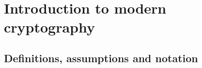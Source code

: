 \documentclass[a4paper, 12pt]{report}
\institute{\curlyquotes{\hspace{0.25mm}Sapienza} Università di Roma}
\subtitle{Appunti integrati con il libro \book}
\author{\textit{Autore}\\\authorName}
\institute{\curlyquotes{\hspace{0.25mm}Sapienza} University of Rome}
\subtitle{Lecture notes integrated with the book \book}
\author{\textit{Author}\\\authorName}
\title{\courseName}
\date{\today}
\begin{document}
    \maketitle

    {
        \hypersetup{allcolors=black}

        \romantableofcontents
    }

    \introduction


    \chapter{Introduction to modern cryptography}

    \section{Definitions, assumptions and notation}
\end{document}
